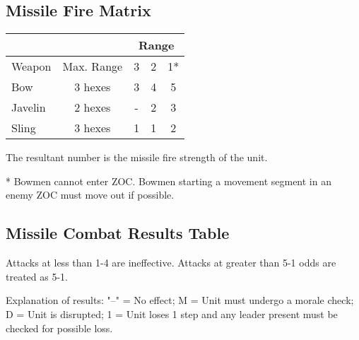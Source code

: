 \subsection{Missile Fire Matrix}

{\def\arraystretch{1.2}
  \begin{tabular}{ |lcccc| }
    \hline
    & & \multicolumn{3}{c|}{ \textbf{Range}} \\
    \hline
    Weapon & Max. Range & 3 & 2 & 1* \\
    \hline
    Bow & 3 hexes & 3 & 4 & 5 \\
    Javelin & 2 hexes & - & 2 & 3 \\
    Sling & 3 hexes & 1 & 1 & 2 \\
    \hline
  \end{tabular}
}
\par
The resultant number is the missile fire strength of the unit.

* Bowmen cannot enter ZOC. Bowmen starting a movement segment in an enemy ZOC must move out if possible.

\subsection{Missile Combat Results Table}

{\def\arraystretch{1.2}
}
\par
Attacks at less than 1-4 are ineffective. Attacks at greater than 5-1 odds are treated as 5-1.

Explanation of results: "--" = No effect; M = Unit must undergo a morale check; D = Unit is disrupted; 1 = Unit loses 1 step and any leader present must be checked for possible loss.
